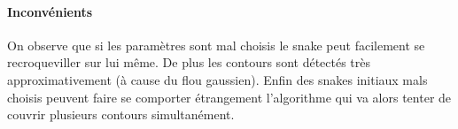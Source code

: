 \begin{figure}
\end{figure}

\paragraph{Inconvénients}
On observe que si les paramètres sont mal choisis le snake peut facilement se recroqueviller sur lui même. De plus les contours sont détectés très approximativement (à cause du flou gaussien). Enfin des snakes initiaux mals choisis peuvent faire se comporter étrangement l'algorithme qui va alors tenter de couvrir plusieurs contours simultanément.
